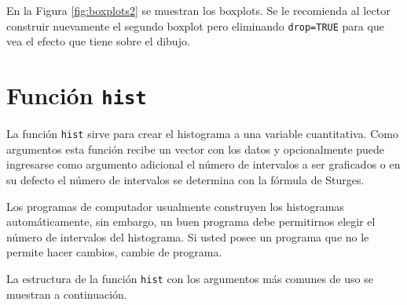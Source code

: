 \documentclass[10pt,]{krantz}
\let\BeginKnitrBlock\begin \let\EndKnitrBlock\end
\begin{document}
En la Figura \ref{fig:boxplots2} se muestran los boxplots. Se le
recomienda al lector construir nuevamente el segundo boxplot pero
eliminando \texttt{drop=TRUE} para que vea el efecto que tiene sobre el
dibujo.

\section{\texorpdfstring{Función
\texttt{hist}}{Función hist}}\label{funcion-hist}

La función \texttt{hist} sirve para crear el histograma
 a una variable cuantitativa. Como
argumentos esta función recibe un vector con los datos y opcionalmente
puede ingresarse como argumento adicional el número de intervalos a ser
graficados o en su defecto el número de intervalos se determina con la
fórmula de Sturges.

\BeginKnitrBlock{rmdtip}
Los programas de computador usualmente construyen los histogramas
automáticamente, sin embargo, un buen programa debe permitirnos elegir
el número de intervalos del histograma. Si usted posee un programa que
no le permite hacer cambios, cambie de programa.
\EndKnitrBlock{rmdtip}

La estructura de la función \texttt{hist} con los argumentos más comunes
de uso se muestran a continuación.
\end{document}
